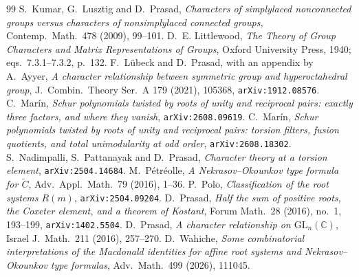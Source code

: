 \documentclass[11pt,a4paper]{article}
\theoremstyle{definition}
\newcommand{\GL}{\mathrm{GL}}
\begin{document}
\begin{thebibliography}{99}
 S.~Kumar, G.~Lusztig and D.~Prasad, \emph{Characters of simplylaced nonconnected
groups versus characters of nonsimplylaced connected groups}, Contemp.~Math.~478 (2009), 99--101.
 D.~E. Littlewood, \emph{The Theory of Group Characters and Matrix Representations of
Groups}, Oxford University Press, 1940; eqs.~7.3.1--7.3.2, p.~132.
 F.~L\"ubeck and D.~Prasad, with an appendix by A.~Ayyer, \emph{A character
relationship between symmetric group and hyperoctahedral group}, J.~Combin.~Theory Ser.~A 179 (2021), 105368,
\texttt{arXiv:1912.08576}.
 C.~Mar\'in, \emph{Schur polynomials twisted by roots of unity and reciprocal pairs:
exactly three factors, and where they vanish}, \texttt{arXiv:2608.09619}.
 C.~Mar\'in, \emph{Schur polynomials twisted by roots of unity and reciprocal pairs:
torsion filters, fusion quotients, and total unimodularity at odd order},
\texttt{arXiv:2608.18302}.
 S.~Nadimpalli, S.~Pattanayak and D.~Prasad, \emph{Character theory at a torsion
element}, \texttt{arXiv:2504.14684}.
 M.~P\'etr\'eolle, \emph{A Nekrasov--Okounkov type formula for
$\widetilde{C}$}, Adv.~Appl.~Math.~79 (2016), 1--36.
 P.~Polo, \emph{Classification of the root systems $R(m)$},
\texttt{arXiv:2504.09204}.
 D.~Prasad, \emph{Half the sum of positive roots, the Coxeter element, and a
theorem of Kostant}, Forum Math.~28 (2016), no.~1, 193--199, \texttt{arXiv:1402.5504}.
 D.~Prasad, \emph{A character relationship on $\GL_n(\mathbb{C})$},
Israel J.~Math.~211 (2016), 257--270.
 D.~Wahiche, \emph{Some combinatorial interpretations of the Macdonald identities
for affine root systems and Nekrasov--Okounkov type formulas}, Adv.~Math.~499 (2026), 111045.
\end{thebibliography}
\end{document}
